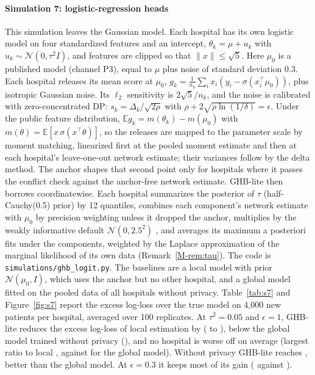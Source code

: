 \documentclass[acmsmall,screen,nonacm]{acmart}
\theoremstyle{acmdefinition}
\begin{document}
\paragraph{Simulation 7: logistic-regression heads} This simulation leaves the Gaussian model. Each hospital has its own logistic model on four standardized features and an intercept, $\theta_k=\mu+u_k$ with $u_k\sim\mathcal{N}(0,\tau^2 I)$, and features are clipped so that $\|x\|\le\sqrt{5}$. Here $\mu_0$ is a published model (channel P3), equal to $\mu$ plus noise of standard deviation 0.3. Each hospital releases its mean score at $\mu_0$, $g_k=\frac{1}{n_k}\sum_i x_i(y_i-\sigma(x_i^\top\mu_0))$, plus isotropic Gaussian noise. Its $\ell_2$ sensitivity is $2\sqrt{5}/n_k$, and the noise is calibrated with zero-concentrated DP: $s_k=\Delta_k/\sqrt{2\rho}$ with $\rho+2\sqrt{\rho\ln(1/\delta)}=\epsilon$. Under the public feature distribution, $\mathbb{E}g_k=m(\theta_k)-m(\mu_0)$ with $m(\theta)=\mathbb{E}[x\,\sigma(x^\top\theta)]$, so the releases are mapped to the parameter scale by moment matching, linearized first at the pooled moment estimate and then at each hospital's leave-one-out network estimate; their variances follow by the delta method. The anchor shapes that second point only for hospitals where it passes the conflict check against the anchor-free network estimate. GHB-lite then borrows coordinatewise. Each hospital summarizes the posterior of $\tau$ (half-Cauchy(0.5) prior) by 12 quantiles, combines each component's network estimate with $\mu_0$ by precision weighting unless it dropped the anchor, multiplies by the weakly informative default $\mathcal{N}(0,2.5^2)$ \cite{gelman2008weakly}, and averages its maximum a posteriori fits under the components, weighted by the Laplace approximation of the marginal likelihood of its own data (Remark~\ref{M-rem:tau}). The code is \texttt{simulations/ghb\_logit.py}. The baselines are a local model with prior $\mathcal{N}(\mu_0,I)$, which uses the anchor but no other hospital, and a global model fitted on the pooled data of all hospitals without privacy. Table~\ref{tab:s7} and Figure~\ref{fig:s7} report the excess log-loss over the true model on 4,000 new patients per hospital, averaged over 100 replicates. At $\tau^2=0.05$ and $\epsilon=1$, GHB-lite reduces the excess log-loss of local estimation by \SimSevenReduction{} (\SimSevenLocal{} to \SimSevenGHB), below the global model trained without privacy (\SimSevenGlobal), and no hospital is worse off on average (largest ratio to local \SimSevenWorstRatio, against \SimSevenGlobalWorstRatio{} for the global model). Without privacy GHB-lite reaches \SimSevenGHBNoDP, better than the global model. At $\epsilon=0.3$ it keeps most of its gain (\SimSevenGHBTenth{} against \SimSevenLocalTenth).
\end{document}
